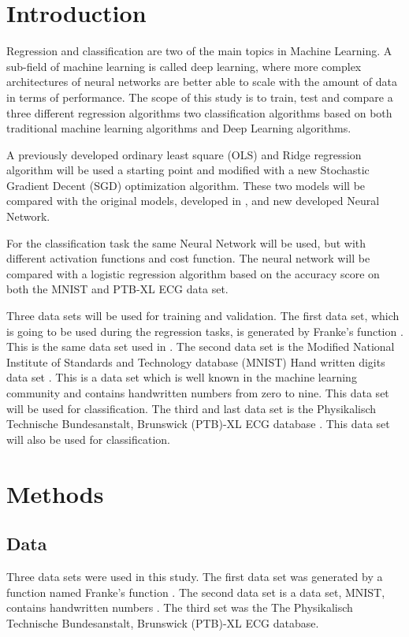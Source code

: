\documentclass[twocolumn]{cinc}
\begin{document}
\section{Introduction}
Regression and classification are two of the main topics in Machine Learning. A sub-field of machine learning is called deep learning, where more complex architectures of neural networks are better able to scale with the amount of data in terms of performance. The scope of this study is to train, test and compare a three different regression algorithms two classification algorithms based on both traditional machine learning algorithms and Deep Learning algorithms.

A previously developed ordinary least square (OLS) and Ridge regression algorithm\cite{bjorn-jostein_singstad_using_nodate} will be used a starting point and modified with a new Stochastic Gradient Decent (SGD) optimization algorithm. These two models will be compared with the original models, developed in  \cite{bjorn-jostein_singstad_using_nodate}, and new developed Neural Network. 

For the classification task the same Neural Network will be used, but with different activation functions and cost function. The neural network will be compared with a logistic regression algorithm based on the accuracy score on both the MNIST and PTB-XL ECG data set.

Three data sets will be used for training and validation. The first data set, which is going to be used during the regression tasks, is generated by Franke's function \cite{franke_r_critical_1979}. This is the same data set used in \cite{bjorn-jostein_singstad_using_nodate}. The second data set is the Modified National Institute of Standards and Technology database (MNIST) Hand written digits data set \cite{lecun_mnist_2010}. This is a data set which is well known in the machine learning community and contains handwritten numbers from zero to nine. This data set will be used for classification. The third and last data set is the Physikalisch Technische Bundesanstalt, Brunswick (PTB)-XL ECG database \cite{wagner_ptb-xl_2020-1, goldberger_physiobank_2000}. This data set will also be used for classification.



\section{Methods}
\subsection{Data}
Three data sets were used in this study. The first data set was generated by a function named Franke's function \cite{franke_r_critical_1979}. The second data set is a data set, MNIST, contains handwritten numbers \cite{lecun_mnist_2010}. The third set was the The Physikalisch Technische Bundesanstalt, Brunswick (PTB)-XL ECG database\cite{wagner_ptb-xl_2020-1, goldberger_physiobank_2000}.
\end{document}
